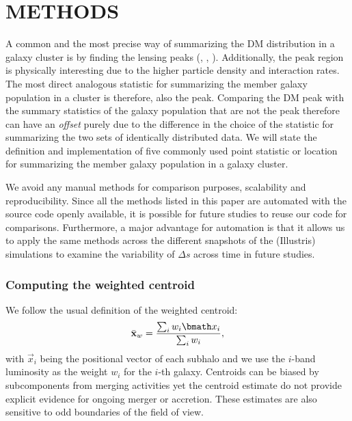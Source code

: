 \section{METHODS}\label{sec:methods}
A common and the most precise way of summarizing the DM distribution in a
galaxy cluster is by finding the lensing peaks 
(\citealt{Medezinski2013}, \citealt{Markevitch2004}, \citealt{Zitrin13}).
Additionally, the peak region is physically 
interesting due to the higher particle density and interaction rates. 
The most direct analogous statistic for summarizing the member galaxy
population in a cluster is therefore, also the peak. 
Comparing the DM peak with the summary statistics of the galaxy population that
are not the peak therefore can have an {\it offset} purely due to the difference in
the choice of the statistic for summarizing the two sets of identically
distributed data. 
We will state the definition and implementation of five commonly used 
point statistic or location for summarizing 
the member galaxy population in a galaxy cluster.

We avoid any manual methods for
comparison purposes, scalability and reproducibility. 
Since all the methods listed in this
paper are automated with the source code openly available, 
it is possible for future studies to reuse our code for comparisons. 
Furthermore, a major advantage for automation is that it allows us  
to apply
the same methods across the different snapshots of the (Illustris) simulations to
examine the variability of $\Delta s$ across time in future studies. 


\subsubsection{Computing the weighted centroid}
\label{subsubsec:weighted_centroid}
We follow the usual definition of the weighted centroid: 
\begin{equation}
	\bar{\bf x}_w = \frac{\sum_i w_i \vec{x}_i}{\sum_i w_i},
\end{equation}
with $\vec{x}_i$ being the positional vector of each subhalo 
and we use the $i$-band luminosity 
as the weight $w_i$ for the $i$-th galaxy.
Centroids can be biased by subcomponents from merging activities yet the
centroid estimate do not provide explicit evidence for ongoing merger or 
accretion. These estimates are also sensitive to odd boundaries 
of the field of view.

